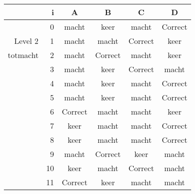\begin{tabular}{ rr| c|c|c|c}\hline\hline
     & i & \textbf{A} & \textbf{B} & \textbf{C} & \textbf{D}\\\hline

&0&macht&keer&macht&Correct\cellcolor[gray]{0.6}\\
Level 2 & 1&macht&macht&Correct\cellcolor[gray]{0.6}&keer\\
totmacht &2&macht&Correct\cellcolor[gray]{0.6}&macht&keer\\
&3&macht&keer&Correct\cellcolor[gray]{0.6}&macht\\
&4&macht&keer&macht&Correct\cellcolor[gray]{0.6}\\
&5&macht&keer&macht&Correct\cellcolor[gray]{0.6}\\
&6&Correct\cellcolor[gray]{0.6}&macht&macht&keer\\
&7&keer&macht&macht&Correct\cellcolor[gray]{0.6}\\
&8&keer&macht&macht&Correct\cellcolor[gray]{0.6}\\
&9&macht&Correct\cellcolor[gray]{0.6}&keer&macht\\
&10&keer&macht&Correct\cellcolor[gray]{0.6}&macht\\
&11&Correct\cellcolor[gray]{0.6}&keer&macht&macht\\
\hline\end{tabular}\par\ \newline

